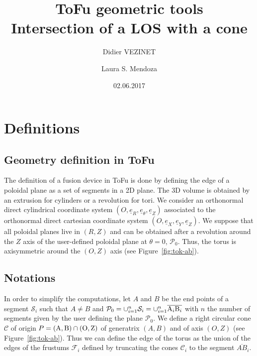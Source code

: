 \documentclass[a4paper,11pt,twoside,titlepage,openright]{book}
\numberwithin{equation}{section}
\newcommand{\ud}[1]{\underline{#1}}
\begin{document}
\title{ToFu geometric tools\\ Intersection of a LOS with a cone}
\author{Didier VEZINET \and Laura S. Mendoza}
\date{02.06.2017}
\maketitle





\chapter{Definitions}

\section{Geometry definition in ToFu}

The definition of a fusion device in ToFu is done by defining the edge of a poloidal plane as a set of segments in a 2D plane. The 3D volume is obtained by an extrusion for cylinders or a revolution for tori.
We consider an orthonormal direct cylindrical coordinate system $(O,\ud{e}_R,\ud{e}_{\theta},\ud{e}_Z)$ associated to the orthonormal direct cartesian coordinate system $(O,\ud{e}_X,\ud{e}_Y,\ud{e}_Z)$. We suppose that all poloidal planes live in $(R,Z)$ and can be obtained after a revolution around the $Z$ axis of the user-defined poloidal plane at $\theta=0$, $\mathcal{P}_0$. Thus, the torus is axisymmetric around the $(O,Z)$ axis (see Figure~\ref{fig:tok-ab}).




\begin{figure}[h]
\end{figure}

\section{Notations}

In order to simplify the computations, let $A$ and $B$ be the end points of a segment $\mathcal{S}_i$ such that $A\neq B$ and $\mathcal{P}_0 = \cup_{i=1}^{n} \mathcal{S}_i = \cup_{i=1}^n \overline{{\rm A}_i{\rm B}_i}$ with $n$ the number of segments given by the user defining the plane $\mathcal{P}_0$. We define a right circular cone $\mathcal{C}$ of origin $P = ({\rm A},{\rm B}) \cap ({\rm O}, {\rm Z})$ of generatrix $(A,B)$ and of axis $(O,Z)$ (see Figure~\ref{fig:tok-ab}). Thus we can define the edge of the torus as the union of the edges of the frustums $\mathcal{F}_i$ defined by truncating the cones $\mathcal{C}_i$ to the segment $\overline{AB}_i$.
\end{document}
